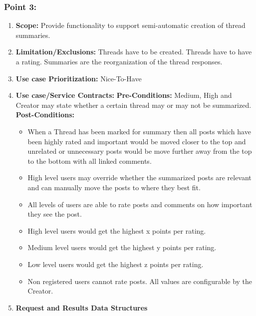 \documentclass[11pt]{article}
\begin{document}
\subsubsection{Point 3:}
\begin{enumerate}
	\item 
	\textbf{Scope:}
	\newline
	Provide functionality to support semi-automatic creation of thread summaries.
	\item\textbf{Limitation/Exclusions: }
	\newline
	 Threads have to be created.
	Threads have to have a rating.
	Summaries are the reorganization of the thread responses.
	\item\textbf{Use case Prioritization:} 
	\newline
	Nice-To-Have
	\item \textbf{Use case/Service Contracts:} 
	\newline\newline
	\textbf{Pre-Conditions: }
	Medium, High and Creator may state whether a certain thread may or may not be summarized.
	\newline\textbf{Post-Conditions: }
	\begin{itemize}
		\item When a Thread has been marked for summary then all posts which have been highly rated and important would be moved closer to the top and 	unrelated or unnecessary posts would be move further away from the top to the bottom with all linked comments. 
		\item High level users may override whether the summarized posts are relevant and can manually move the posts to where they best fit.
		\item All levels of users are able to rate posts and comments on how important they see the post.
		\item High level users would get the highest x points per rating.
		\item Medium level users would get the highest y points per rating.
		\item Low level users would get the highest z points per rating.
		\item Non registered users cannot rate posts.
		All values are configurable by the Creator.
	\end{itemize}
	\newpage
			 \item	\textbf{Request and Results Data Structures}
			 	  		\begin{center}

\end{center}
\end{enumerate}
\end{document}
